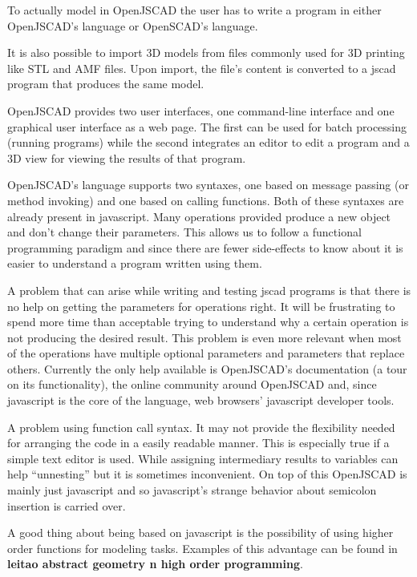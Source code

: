 \documentclass{./llncs2e/llncs}
\begin{document}
	To actually model in OpenJSCAD the user has to write a program in either OpenJSCAD's language or OpenSCAD's language.

	It is also possible to import 3D models from files commonly used for 3D printing like STL and AMF files.
	Upon import, the file's content is converted to a jscad program that produces the same model. 

	OpenJSCAD provides two user interfaces, one command-line interface and one graphical user interface as a web page.
	The first can be used for batch processing (running programs) while the second integrates an editor to edit a program and a 3D view for viewing the results of that program.

	OpenJSCAD's language supports two syntaxes, one based on message passing (or method invoking) and one based on calling functions.
	Both of these syntaxes are already present in javascript. 
	Many operations provided produce a new object and don't change their parameters. 
	This allows us to follow a functional programming paradigm and since there are fewer side-effects to know about it is easier to understand a program written using them.

	A problem that can arise while writing and testing jscad programs is that there is no help on getting the parameters for operations right.
	It will be frustrating to spend more time than acceptable trying to understand why a certain operation is not producing the desired result. 
	This problem is even more relevant when most of the operations have multiple optional parameters and parameters that replace others. 
	Currently the only help available is OpenJSCAD's documentation (a tour on its functionality), the online community around OpenJSCAD and, since javascript is the core of the language, web browsers' javascript developer tools.

	A problem using function call syntax.
	It may not provide the flexibility needed for arranging the code in a easily readable manner. 
	This is especially true if a simple text editor is used. 
	While assigning intermediary results to variables can help ``unnesting'' but it is sometimes inconvenient. 
	On top of this OpenJSCAD is mainly just javascript and so javascript's strange behavior about semicolon insertion is carried over. 

	A good thing about being based on javascript is the possibility of using higher order functions for modeling tasks.
	Examples of this advantage can be found in \textbf{leitao abstract geometry n high order programming}.
\end{document}
